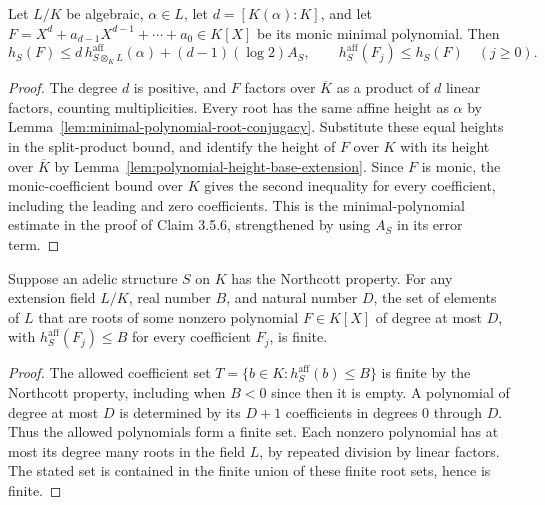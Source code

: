 \begin{lemma}
\label{lem:minimal-polynomial-height}
\leanok
Let $L/K$ be algebraic, $\alpha\in L$, let $d=[K(\alpha):K]$, and let
$F=X^d+a_{d-1}X^{d-1}+\cdots+a_0\in K[X]$ be its monic
minimal polynomial. Then
\[
 h_S(F)\leq d\,h_{S\otimes_K L}^{\mathrm{aff}}(\alpha)+(d-1)(\log2)A_S,
 \qquad
 h_S^{\mathrm{aff}}(F_j)\leq h_S(F)\quad(j\geq0).
\]
\end{lemma}
\begin{proof}
The degree $d$ is positive, and $F$ factors over $\overline K$
as a product of $d$ linear factors, counting multiplicities.
Every root has the same affine height as $\alpha$ by
Lemma~\ref{lem:minimal-polynomial-root-conjugacy}. Substitute
these equal heights in the split-product bound, and identify the
height of $F$ over $K$ with its height over $\overline K$ by
Lemma~\ref{lem:polynomial-height-base-extension}. Since $F$ is monic,
the monic-coefficient bound over $K$ gives the second inequality
for every coefficient, including the leading and zero coefficients.
This is the minimal-polynomial estimate in the
proof of Claim 3.5.6, strengthened by using $A_S$ in its error term.
\end{proof}

\begin{lemma}
\label{lem:northcott-bounded-coefficient-roots}
\leanok
Suppose an adelic structure $S$ on $K$ has the Northcott property.
For any extension field $L/K$, real number $B$, and natural number $D$,
the set of elements of $L$ that are roots of some nonzero polynomial
$F\in K[X]$ of degree at most $D$, with
$h_S^{\mathrm{aff}}(F_j)\leq B$ for every coefficient $F_j$, is finite.
\end{lemma}
\begin{proof}
The allowed coefficient set $T=\{b\in K:h_S^{\mathrm{aff}}(b)\leq B\}$
is finite by the Northcott property, including when $B<0$ since then
it is empty. A polynomial of degree at most $D$ is determined by its
$D+1$ coefficients in degrees $0$ through $D$. Thus the allowed
polynomials form a finite set. Each nonzero polynomial has at most its
degree many roots in the field $L$, by repeated division by linear
factors. The stated set is contained in the finite union of these finite
root sets, hence is finite.
\end{proof}

